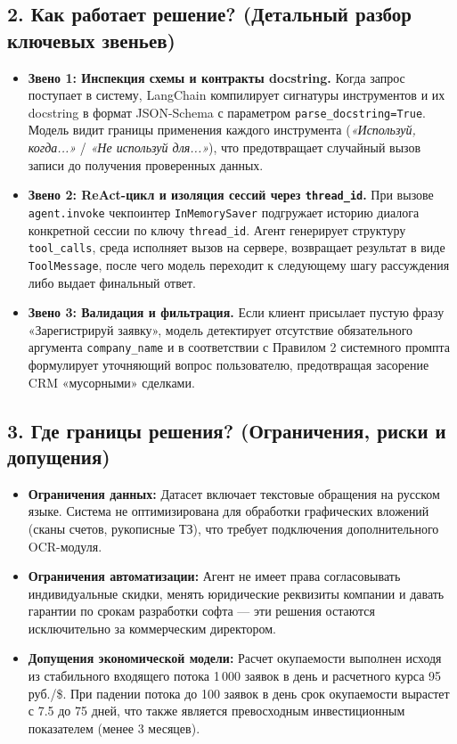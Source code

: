 \documentclass[12pt,a4paper]{article}
\begin{document}
	\subsection*{2. Как работает решение? (Детальный разбор ключевых звеньев)}
	\begin{itemize}[leftmargin=*,topsep=2pt]
		\item \textbf{Звено 1: Инспекция схемы и контракты docstring.} Когда запрос поступает в систему, LangChain компилирует сигнатуры инструментов и их docstring в формат JSON-Schema с параметром \texttt{parse\_docstring=True}. Модель видит границы применения каждого инструмента (\textit{«Используй, когда...»} / \textit{«Не используй для...»}), что предотвращает случайный вызов записи до получения проверенных данных.
		\item \textbf{Звено 2: ReAct-цикл и изоляция сессий через \texttt{thread\_id}.} При вызове \texttt{agent.invoke} чекпоинтер \texttt{InMemorySaver} подгружает историю диалога конкретной сессии по ключу \texttt{thread\_id}. Агент генерирует структуру \texttt{tool\_calls}, среда исполняет вызов на сервере, возвращает результат в виде \texttt{ToolMessage}, после чего модель переходит к следующему шагу рассуждения либо выдает финальный ответ.
		\item \textbf{Звено 3: Валидация и фильтрация.} Если клиент присылает пустую фразу «Зарегистрируй заявку», модель детектирует отсутствие обязательного аргумента \texttt{company\_name} и в соответствии с Правилом 2 системного промпта формулирует уточняющий вопрос пользователю, предотвращая засорение CRM «мусорными» сделками.
	\end{itemize}

	\subsection*{3. Где границы решения? (Ограничения, риски и допущения)}
	\begin{itemize}[leftmargin=*,topsep=2pt]
		\item \textbf{Ограничения данных:} Датасет включает текстовые обращения на русском языке. Система не оптимизирована для обработки графических вложений (сканы счетов, рукописные ТЗ), что требует подключения дополнительного OCR-модуля.
		\item \textbf{Ограничения автоматизации:} Агент не имеет права согласовывать индивидуальные скидки, менять юридические реквизиты компании и давать гарантии по срокам разработки софта --- эти решения остаются исключительно за коммерческим директором.
		\item \textbf{Допущения экономической модели:} Расчет окупаемости выполнен исходя из стабильного входящего потока 1\,000 заявок в день и расчетного курса 95 руб./\$. При падении потока до 100 заявок в день срок окупаемости вырастет с 7.5 до 75 дней, что также является превосходным инвестиционным показателем (менее 3 месяцев).
	\end{itemize}
\end{document}
